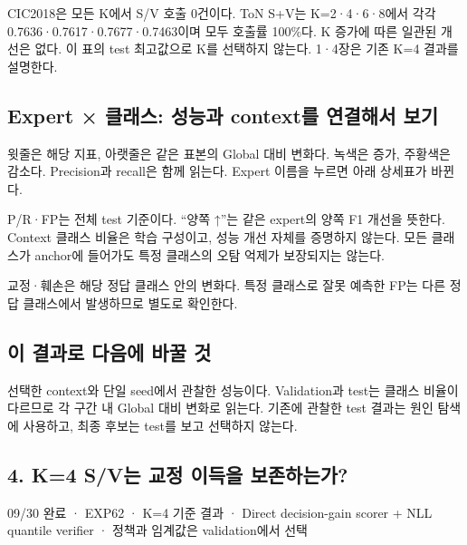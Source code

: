 CIC2018은 모든 K에서 S/\allowbreak{}V 호출 0건이다. ToN S+\allowbreak{}V는 K=\allowbreak{}2·4·6·8에서 각각 0.7636·0.7617·0.7677·0.7463이며 모두 호출률 100\%다. K 증가에 따른 일관된 개선은 없다. 이 표의 test 최고값으로 K를 선택하지 않는다. 1·4장은 기존 K=\allowbreak{}4 결과를 설명한다.

\subsection*{Expert × 클래스: 성능과 context를 연결해서 보기}
윗줄은 해당 지표, 아랫줄은 같은 표본의 Global 대비 변화다. 녹색은 증가, 주황색은 감소다. Precision과 recall은 함께 읽는다. Expert 이름을 누르면 아래 상세표가 바뀐다.

P/\allowbreak{}R·FP는 전체 test 기준이다. “양쪽 ↑”는 같은 expert의 양쪽 F1 개선을 뜻한다. Context 클래스 비율은 학습 구성이고, 성능 개선 자체를 증명하지 않는다. 모든 클래스가 anchor에 들어가도 특정 클래스의 오탐 억제가 보장되지는 않는다.

교정·훼손은 해당 정답 클래스 안의 변화다. 특정 클래스로 잘못 예측한 FP는 다른 정답 클래스에서 발생하므로 별도로 확인한다.

\subsection*{이 결과로 다음에 바꿀 것}
선택한 context와 단일 seed에서 관찰한 성능이다. Validation과 test는 클래스 비율이 다르므로 각 구간 내 Global 대비 변화로 읽는다. 기존에 관찰한 test 결과는 원인 탐색에 사용하고, 최종 후보는 test를 보고 선택하지 않는다.

\subsection*{4. K=\allowbreak{}4 S/\allowbreak{}V는 교정 이득을 보존하는가?}
09/\allowbreak{}30 완료 · EXP62 · K=\allowbreak{}4 기준 결과 · Direct decision-gain scorer +\allowbreak{} NLL quantile verifier · 정책과 임계값은 validation에서 선택

